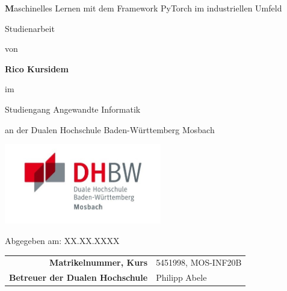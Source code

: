 
\def\title{Maschinelles Lernen mit dem Framework PyTorch im industriellen Umfeld}
\def\abgabe{XX.XX.XXXX}

\begin{titlepage}
	
	
	
	\vspace{5pt}
	
	\begin{center}
		
		\Large \textbf\title
		
		\vspace{50pt}
		
		\large Studienarbeit
		
		von 
		
		\large \textbf{Rico Kursidem} 
		
		\vspace{15pt}
		
		im
		
		\large Studiengang Angewandte Informatik
		
		an der Dualen Hochschule Baden-Württemberg Mosbach

        \vspace{10pt}

        \includegraphics[height=3.5cm]{images/dhbw-logo.jpg}
		
		\vspace{20pt}
		
		\large Abgegeben am: \abgabe
		
		\vspace{30pt}

		
		\begin{table}[h]
			\centering
			\begin{tabular}{r l}
				\large\textbf{Matrikelnummer, Kurs} & \large 5451998, MOS-INF20B \\
                \large\textbf{Betreuer der Dualen Hochschule} & \large Philipp Abele \\
			\end{tabular}
			
		\end{table}
		
	\end{center}
	
	
\end{titlepage}
